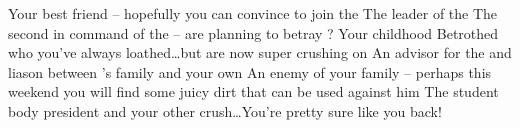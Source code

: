 \documentclass[char]{GL2020}
\begin{document}
\begin{itemz}[Notes]
	\item 
\end{itemz}
 
\begin{contacts}
	\contact{\cAmbition{}} Your best friend -- hopefully you can convince  to join the \pGoaties{}
	\contact{\cChupLeader{}} The leader of the \pGoaties{}
	\contact{\cChupSecond{}} The second in command of the \pGoaties{} -- are \cChupSecond{} planning to betray \cChupLeader{}?
	\contact{\cHeir{}} Your childhood Betrothed who you've always loathed\ldots but are now super crushing on
	\contact{\cDiplomat{}} An advisor for the \pTech{} and liason between \cHeir{}'s family and your own
	\contact{\cEvil{}} An enemy of your family -- perhaps this weekend you will find some juicy dirt that can be used against him
	\contact{\cPresident{}} The student body president and your other crush\ldots You're pretty sure  like you back!
\end{contacts}
 
\end{document}
